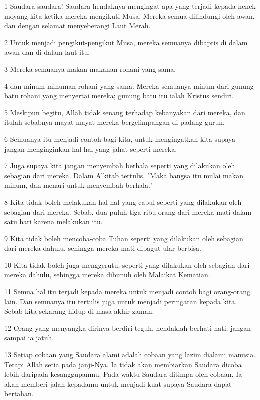 \par 1 Saudara-saudara! Saudara hendaknya mengingat apa yang terjadi kepada nenek moyang kita ketika mereka mengikuti Musa. Mereka semua dilindungi oleh awan, dan dengan selamat menyeberangi Laut Merah.
\par 2 Untuk menjadi pengikut-pengikut Musa, mereka semuanya dibaptis di dalam awan dan di dalam laut itu.
\par 3 Mereka semuanya makan makanan rohani yang sama,
\par 4 dan minum minuman rohani yang sama. Mereka semuanya minum dari gunung batu rohani yang menyertai mereka; gunung batu itu ialah Kristus sendiri.
\par 5 Meskipun begitu, Allah tidak senang terhadap kebanyakan dari mereka, dan itulah sebabnya mayat-mayat mereka bergelimpangan di padang gurun.
\par 6 Semuanya itu menjadi contoh bagi kita, untuk mengingatkan kita supaya jangan menginginkan hal-hal yang jahat seperti mereka.
\par 7 Juga supaya kita jangan menyembah berhala seperti yang dilakukan oleh sebagian dari mereka. Dalam Alkitab tertulis, "Maka bangsa itu mulai makan minum, dan menari untuk menyembah berhala."
\par 8 Kita tidak boleh melakukan hal-hal yang cabul seperti yang dilakukan oleh sebagian dari mereka. Sebab, dua puluh tiga ribu orang dari mereka mati dalam satu hari karena melakukan itu.
\par 9 Kita tidak boleh mencoba-coba Tuhan seperti yang dilakukan oleh sebagian dari mereka dahulu, sehingga mereka mati dipagut ular berbisa.
\par 10 Kita tidak boleh juga menggerutu; seperti yang dilakukan oleh sebagian dari mereka dahulu, sehingga mereka dibunuh oleh Malaikat Kematian.
\par 11 Semua hal itu terjadi kepada mereka untuk menjadi contoh bagi orang-orang lain. Dan semuanya itu tertulis juga untuk menjadi peringatan kepada kita. Sebab kita sekarang hidup di masa akhir zaman.
\par 12 Orang yang menyangka dirinya berdiri teguh, hendaklah berhati-hati; jangan sampai ia jatuh.
\par 13 Setiap cobaan yang Saudara alami adalah cobaan yang lazim dialami manusia. Tetapi Allah setia pada janji-Nya. Ia tidak akan membiarkan Saudara dicoba lebih daripada kesanggupanmu. Pada waktu Saudara ditimpa oleh cobaan, Ia akan memberi jalan kepadamu untuk menjadi kuat supaya Saudara dapat bertahan.

